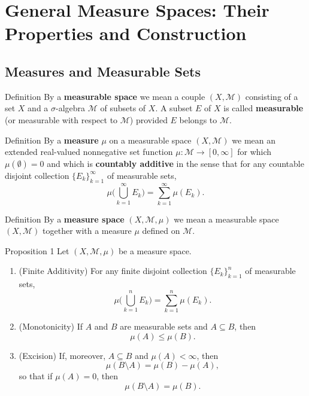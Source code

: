 \chapter{General Measure Spaces: Their Properties and Construction}

\section{Measures and Measurable Sets}
\begin{flushleft}
	\begin{namedthm*}{Definition}
		By a \textbf{measurable space} we mean a couple $(X,\mathcal{M})$ consisting of a set $X$ and a $\sigma$-algebra $\mathcal{M}$ of subsets of $X$.
		A subset $E$ of $X$ is called \textbf{measurable} (or measurable with respect to $\mathcal{M}$) provided $E$ belongs to $\mathcal{M}$.
	\end{namedthm*}
	\begin{namedthm*}{Definition}
		By a \textbf{measure} $\mu$ on a measurable space $(X,\mathcal{M})$ we mean an extended real-valued nonnegative set function $\mu:\mathcal{M}\to[0,\infty]$ for which $\mu(\emptyset)=0$ and which is \textbf{countably additive} in the sense that for any countable disjoint collection $\{E_k\}_{k=1}^\infty$ of measurable sets,
		\[
			\mu\biggl(\bigcup_{k=1}^\infty E_k\biggr)=\sum_{k=1}^\infty\mu(E_k).	
		\]
	\end{namedthm*}
	\begin{namedthm*}{Definition}
		By a \textbf{measure space} $(X,\mathcal{M},\mu)$ we mean a measurable space $(X,\mathcal{M})$ together with a measure $\mu$ defined on $\mathcal{M}$.
	\end{namedthm*}
	\begin{namedthm*}{Proposition 1}
		Let $(X,\mathcal{M},\mu)$ be a measure space.
		\begin{enumerate}[\indent {}]
			\item (Finite Additivity) For any finite disjoint collection $\{E_k\}_{k=1}^n$ of measurable sets,
			\[
				\mu\biggl(\bigcup_{k=1}^n E_k\biggr)=\sum_{k=1}^n\mu(E_k).	
			\]
			\item (Monotonicity) If $A$ and $B$ are measurable sets and $A\subseteq B$, then
			\[
				\mu(A)\le\mu(B).
			\]
			\item (Excision) If, moreover, $A\subseteq B$ and $\mu(A)<\infty$, then
			\[
				\mu(B\setminus A)=\mu(B)-\mu(A),
			\]
			so that if $\mu(A)=0$, then
			\[
				\mu(B\setminus A)=\mu(B).
\]
\end{enumerate}
\end{namedthm*}
\end{flushleft}
